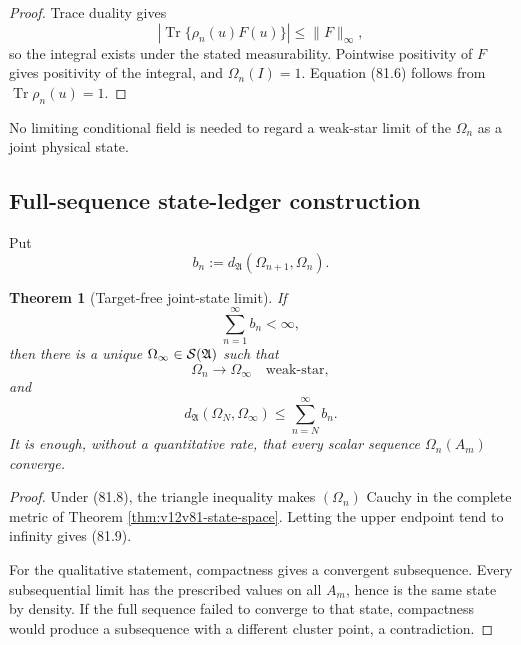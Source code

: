 \documentclass[11pt]{article}
\newtheorem{theorem}{Theorem}[section]
\theoremstyle{remark}
\begin{document}
\begin{proof}
Trace duality gives
\[
 |\operatorname{Tr}\{\rho_n(u)F(u)\}|
 \leq\|F\|_\infty,
\]
so the integral exists under the stated measurability.  Pointwise
positivity of \(F\) gives positivity of the integral, and
\(\Omega_n(I)=1\).  Equation (81.6) follows from
\(\operatorname{Tr}\rho_n(u)=1\).
\end{proof}

No limiting conditional field is needed to regard a weak-star limit
of the \(\Omega_n\) as a joint physical state.

\subsection{Full-sequence state-ledger construction}

Put
\begin{equation}
                         b_n:=
 d_{\mathfrak A}(\Omega_{n+1},\Omega_n).                     \tag{81.7}
\end{equation}

\begin{theorem}[Target-free joint-state limit]
\label{thm:v12v81-cofinal}
If
\begin{equation}
                              \sum_{n=1}^{\infty}b_n<\infty,  \tag{81.8}
\end{equation}
then there is a unique
\(\Omega_\infty\in{\cal S}({\mathfrak A})\) such that
\[
                         \Omega_n\longrightarrow\Omega_\infty
                         \quad\text{weak-star},
\]
and
\begin{equation}
 d_{\mathfrak A}(\Omega_N,\Omega_\infty)
 \leq\sum_{n=N}^{\infty}b_n.                                \tag{81.9}
\end{equation}
It is enough, without a quantitative rate, that every scalar
sequence \(\Omega_n(A_m)\) converge.
\end{theorem}

\begin{proof}
Under (81.8), the triangle inequality makes \((\Omega_n)\) Cauchy in
the complete metric of Theorem \ref{thm:v12v81-state-space}.
Letting the upper endpoint tend to infinity gives (81.9).

For the qualitative statement, compactness gives a convergent
subsequence.  Every subsequential limit has the prescribed values on
all \(A_m\), hence is the same state by density.  If the full
sequence failed to converge to that state, compactness would produce
a subsequence with a different cluster point, a contradiction.
\end{proof}
\end{document}
